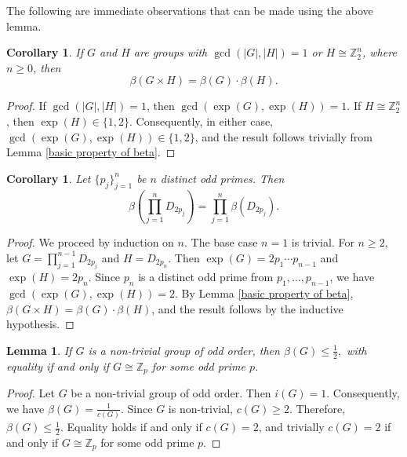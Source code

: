 \documentclass[a4paper,11pt]{amsart}
\numberwithin{equation}{section}
\numberwithin{equation}{subsection}
\newtheorem{corollary}[theorem]{Corollary}
\newtheorem{lemma}[theorem]{Lemma}
\begin{document}
The following are immediate observations that can be made using the above lemma.

\begin{corollary}\label{coprime or Z2n}
    If $G$ and $H$ are groups with $\operatorname{gcd}(|G|,|H|)=1$ or $H\cong \mathbb{Z}_2^n$, where $n\geq 0$, then 
    $$\beta(G\times H)=\beta(G)\cdot \beta(H).$$
\end{corollary}

\begin{proof}
    If $\operatorname{gcd}(|G|,|H|)=1$, then $\operatorname{gcd}(\operatorname{exp}(G),\operatorname{exp}(H)) = 1$. If $H\cong \mathbb{Z}_2^n$, then $\operatorname{exp}(H) \in \{1,2\}$. Consequently, in either case, $\operatorname{gcd}(\operatorname{exp}(G),\operatorname{exp}(H)) \in \{1,2\}$, and the result follows trivially from Lemma \ref{basic property of beta}.
\end{proof}

\begin{corollary}\label{D_2p and D_2q}
    Let $\{p_j\}_{j=1}^{n}$ be $n$ distinct odd primes. Then 
    $$\beta\left(\prod_{j=1}^{n}D_{2p_j}\right)=\prod_{j=1}^{n}\beta(D_{2p_j}).$$
\end{corollary}

\begin{proof}
    We proceed by induction on $n$. The base case $n=1$ is trivial. For $n \geq 2$, let $G = \prod_{j=1}^{n-1}D_{2p_j}$ and $H = D_{2p_n}$. Then $\operatorname{exp}(G)=2p_1 \cdots p_{n-1}$ and $\operatorname{exp}(H)=2p_n$. Since $p_n$ is a distinct odd prime from $p_1, \dots, p_{n-1}$, we have $\operatorname{gcd}(\operatorname{exp}(G), \operatorname{exp}(H)) = 2$. By Lemma \ref{basic property of beta}, $\beta(G \times H) = \beta(G)\cdot\beta(H)$, and the result follows by the inductive hypothesis.
\end{proof}




\begin{lemma}
    If $G $ is a non-trivial group of odd order, then $ \beta(G) \le \frac{1}{2},$ with equality if and only if $G \cong \mathbb{Z}_p $ for some odd prime $p$.
\end{lemma}
\begin{proof}
Let $G$ be a non-trivial group of odd order. Then $i(G) = 1$. Consequently, we have $\beta(G) = \frac{1}{c(G)}$. Since $G$ is non-trivial, $c(G) \ge 2$. Therefore, $\beta(G) \le \frac{1}{2}$. Equality holds if and only if $c(G) = 2$, and trivially $c(G) = 2$ if and only if $G \cong \mathbb{Z}_p$ for some odd prime $p$.
\end{proof}
\end{document}
